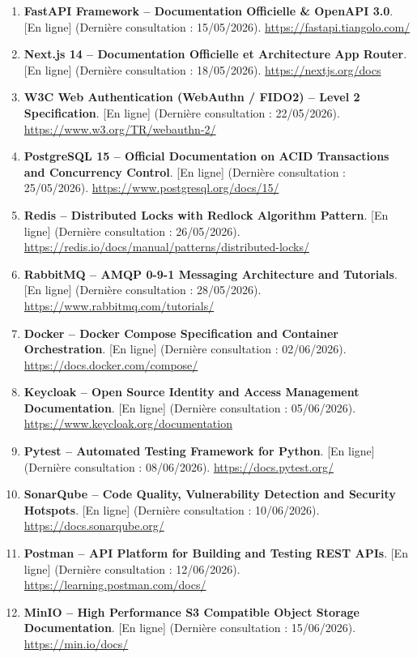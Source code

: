 \begin{enumerate}
    \item \textbf{FastAPI Framework -- Documentation Officielle \& OpenAPI 3.0}. [En ligne] (Dernière consultation : 15/05/2026). \url{https://fastapi.tiangolo.com/}
    \item \textbf{Next.js 14 -- Documentation Officielle et Architecture App Router}. [En ligne] (Dernière consultation : 18/05/2026). \url{https://nextjs.org/docs}
    \item \textbf{W3C Web Authentication (WebAuthn / FIDO2) -- Level 2 Specification}. [En ligne] (Dernière consultation : 22/05/2026). \url{https://www.w3.org/TR/webauthn-2/}
    \item \textbf{PostgreSQL 15 -- Official Documentation on ACID Transactions and Concurrency Control}. [En ligne] (Dernière consultation : 25/05/2026). \url{https://www.postgresql.org/docs/15/}
    \item \textbf{Redis -- Distributed Locks with Redlock Algorithm Pattern}. [En ligne] (Dernière consultation : 26/05/2026). \url{https://redis.io/docs/manual/patterns/distributed-locks/}
    \item \textbf{RabbitMQ -- AMQP 0-9-1 Messaging Architecture and Tutorials}. [En ligne] (Dernière consultation : 28/05/2026). \url{https://www.rabbitmq.com/tutorials/}
    \item \textbf{Docker -- Docker Compose Specification and Container Orchestration}. [En ligne] (Dernière consultation : 02/06/2026). \url{https://docs.docker.com/compose/}
    \item \textbf{Keycloak -- Open Source Identity and Access Management Documentation}. [En ligne] (Dernière consultation : 05/06/2026). \url{https://www.keycloak.org/documentation}
    \item \textbf{Pytest -- Automated Testing Framework for Python}. [En ligne] (Dernière consultation : 08/06/2026). \url{https://docs.pytest.org/}
    \item \textbf{SonarQube -- Code Quality, Vulnerability Detection and Security Hotspots}. [En ligne] (Dernière consultation : 10/06/2026). \url{https://docs.sonarqube.org/}
    \item \textbf{Postman -- API Platform for Building and Testing REST APIs}. [En ligne] (Dernière consultation : 12/06/2026). \url{https://learning.postman.com/docs/}
    \item \textbf{MinIO -- High Performance S3 Compatible Object Storage Documentation}. [En ligne] (Dernière consultation : 15/06/2026). \url{https://min.io/docs/}

\end{enumerate}
